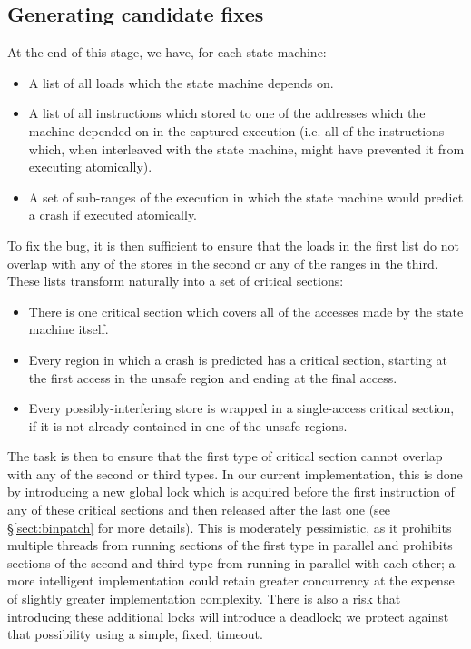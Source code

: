 \documentclass[10pt,twocolumn,preprint,natbib,authoryear]{sigplanconf}
\begin{document}
\subsection{Generating candidate fixes}
\label{sect:gen_fix}

At the end of this stage, we have, for each state machine:

\begin{itemize}
\item A list of all loads which the state machine depends on.
\item A list of all instructions which stored to one of the addresses
  which the machine depended on in the captured execution (i.e. all of
  the instructions which, when interleaved with the state machine,
  might have prevented it from executing atomically).
\item A set of sub-ranges of the execution in which the state machine
  would predict a crash if executed atomically.
\end{itemize}

\noindent
To fix the bug, it is then sufficient to ensure that the loads in the
first list do not overlap with any of the stores in the second or any
of the ranges in the third.  These lists transform naturally into a
set of critical sections:

\begin{itemize}
\item There is one critical section which covers all of the accesses
  made by the state machine itself.
\item Every region in which a crash is predicted has a critical
  section, starting at the first access in the unsafe region and
  ending at the final access.
\item Every possibly-interfering store is wrapped in a single-access
  critical section, if it is not already contained in one of the
  unsafe regions.
\end{itemize}

\noindent
The task is then to ensure that the first type of critical section
cannot overlap with any of the second or third types.  In our current
implementation, this is done by introducing a new global lock which is
acquired before the first instruction of any of these critical
sections and then released after the last one (see
\S\ref{sect:binpatch} for more details).  This is moderately
pessimistic, as it prohibits multiple threads from running sections of
the first type in parallel and prohibits sections of the second and
third type from running in parallel with each other; a more
intelligent implementation could retain greater concurrency at the
expense of slightly greater implementation complexity.  There is also
a risk that introducing these additional locks will introduce a
deadlock; we protect against that possibility using a simple, fixed,
timeout.
\end{document}
